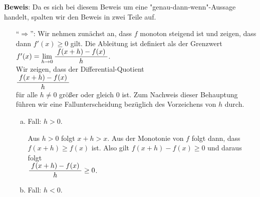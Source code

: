 \noindent
\textbf{Beweis}: Da es sich bei diesem Beweis um eine "genau-dann-wenn"-Aussage handelt, spalten wir
den Beweis in zwei Teile auf.
\begin{enumerate}
\item[``$\Rightarrow$'':]  Wir nehmen zun\"achst an, dass $f$ monoton steigend ist und zeigen, dass
      dann $f'(x) \geq 0$ gilt.  Die Ableitung ist definiert als der Grenzwert 
      \\[0.3cm]
      \hspace*{1.3cm} $f'(x) = \lim\limits_{h \rightarrow 0} \displaystyle\frac{\;\displaystyle f(x+h) - f(x)\;}{\;\displaystyle h\;}$.
      \\[0.3cm]
      Wir zeigen, dass der Differential-Quotient 
      \\[0.3cm]
      \hspace*{1.3cm} $\displaystyle\frac{\;\displaystyle f(x+h) - f(x)\;}{\;\displaystyle h\;}$
      \\[0.3cm]
      f\"ur alle $h \not = 0$ gr\"o{\ss}er oder gleich 0 ist.  Zum Nachweis dieser Behauptung f\"uhren wir
      eine Fallunterscheidung bez\"uglich des Vorzeichens von $h$ durch.
      \begin{enumerate}[(a)]
      \item Fall: $h > 0$.
        
            Aus $h > 0$ folgt $x + h > x$.  Aus der Monotonie von $f$ folgt dann,  dass 
            $f(x+h) \geq f(x)$ ist.  Also gilt $f(x+h)-f(x) \geq 0$ und daraus folgt
            \\[0.3cm]
            \hspace*{1.3cm} $\displaystyle\frac{\;\displaystyle f(x+h) - f(x)\;}{\;\displaystyle h\;} \geq 0$.
      \item Fall: $h < 0$.
        

\end{enumerate}
\end{enumerate}
